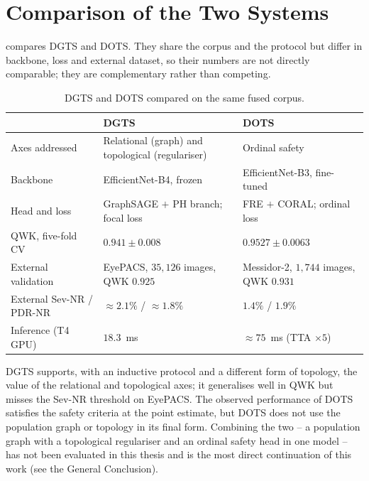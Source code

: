 

\section{Comparison of the Two Systems}
\label{sec:systems}

 compares DGTS and DOTS. They share the corpus and the protocol but
differ in backbone, loss and external dataset, so their numbers are not directly
comparable; they are complementary rather than competing.

\begin{table}[!htbp]
\centering
\caption[DGTS and DOTS compared]{DGTS and DOTS compared on the same fused corpus.}
\label{tab:systems}
\small
\begin{tabular}{@{}P{4.2cm}P{4.8cm}P{4.8cm}@{}}
\toprule
& DGTS~\cite{belhadj2026dgts} & DOTS~\cite{belhadj2026dots} \\
\midrule
Axes addressed & Relational (graph) and topological (regulariser) & Ordinal safety \\
Backbone & EfficientNet-B4, frozen & EfficientNet-B3, fine-tuned \\
Head and loss & GraphSAGE $+$ PH branch; focal loss & FRE $+$ CORAL; ordinal loss \\
QWK, five-fold CV & $0.941\pm0.008$ & $0.9527\pm0.0063$ \\
External validation & EyePACS, $35{,}126$ images, QWK $0.925$ & Messidor-2, $1{,}744$ images, QWK $0.931$ \\
External Sev-NR / PDR-NR & $\approx2.1\%$ / $\approx1.8\%$ & $1.4\%$ / $1.9\%$ \\
Inference (T4 GPU) & $18.3$~ms & $\approx75$~ms (TTA $\times5$) \\
\bottomrule
\end{tabular}
\end{table}

DGTS supports, with an inductive protocol and a different form of topology, the value of the
relational and topological axes; it generalises well in QWK but misses the Sev-NR
threshold on EyePACS. The observed performance of DOTS satisfies the safety criteria at the point estimate, but
DOTS does not use the population graph
or topology in its final form. Combining the two -- a population graph with a topological
regulariser and an ordinal safety head in one model -- has not been evaluated in this thesis
and is the most direct continuation of this work (see the General Conclusion).

